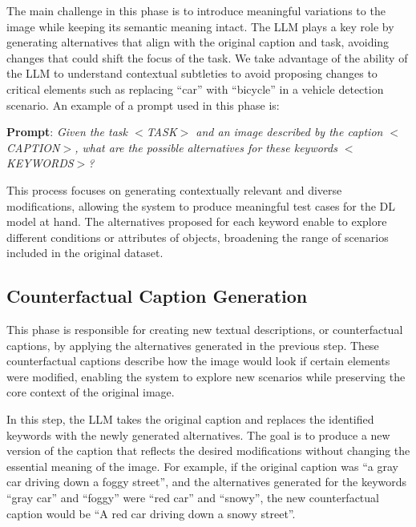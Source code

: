 The main challenge in this phase is to introduce meaningful variations to the image while keeping its semantic meaning intact. The LLM plays a key role by generating alternatives that align with the original caption and task, avoiding changes that could shift the focus of the task. We take advantage of the ability of the LLM to understand contextual subtleties to avoid proposing changes to critical elements such as replacing ``car'' with ``bicycle'' in a vehicle detection scenario. An example of a prompt used in this phase is:

\begin{tcolorbox}[arc=.3em,left=.3em,right=.3em,top=.3em,bottom=.3em]
\begin{center}
\begin{minipage}[t]{.99\linewidth}
\textbf{Prompt}: \textit{
Given the task $<$TASK$>$ and an image described by the caption $<$CAPTION$>$, what are the possible alternatives for these keywords $<$KEYWORDS$>$?
}
\end{minipage}
\end{center}
\end{tcolorbox}

This process focuses on generating contextually relevant and diverse modifications, allowing the system to produce meaningful test cases for the DL model at hand. The alternatives proposed for each keyword enable \approach to explore different conditions or attributes of objects, broadening the range of scenarios included in the original dataset.

\subsection{Counterfactual Caption Generation}

This phase is responsible for creating new textual descriptions, or counterfactual captions, by applying the alternatives generated in the previous step. These counterfactual captions describe how the image would look if certain elements were modified, enabling the system to explore new scenarios while preserving the core context of the original image.

In this step, the LLM takes the original caption and replaces the identified keywords with the newly generated alternatives. The goal is to produce a new version of the caption that reflects the desired modifications without changing the essential meaning of the image. For example, if the original caption was ``a gray car driving down a foggy street'', and the alternatives generated for the keywords ``gray car'' and ``foggy'' were ``red car'' and ``snowy'', the new counterfactual caption would be ``A red car driving down a snowy street''.

